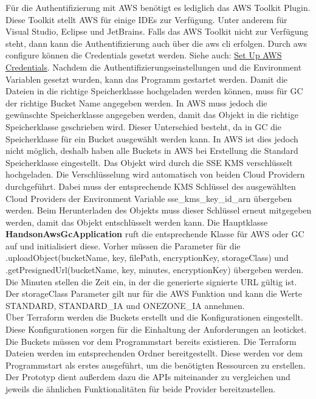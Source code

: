Für die Authentifizierung mit AWS benötigt es lediglich das AWS Toolkit Plugin. Diese Toolkit stellt AWS für einige IDEs zur Verfügung. Unter anderem für Visual Studio, Eclipse und JetBrains. Falls das AWS Toolkit nicht zur Verfügung steht, dann kann die Authentifizierung auch über die aws cli erfolgen. Durch aws configure können die Credentials gesetzt werden. Siehe auch: \href{https://docs.aws.amazon.com/sdk-for-java/latest/developer-guide/setup-basics.html}{Set Up AWS Credentials}. Nachdem die Authentifizierungseinstellungen und die Environment Variablen gesetzt wurden, kann das Programm gestartet werden. Damit die Dateien in die richtige Speicherklasse hochgeladen werden können, muss für GC der richtige Bucket Name angegeben werden. In AWS muss jedoch die gewünschte Speicherklasse angegeben werden, damit das Objekt in die richtige Speicherklasse geschrieben wird. Dieser Unterschied besteht, da in GC die Speicherklasse für ein Bucket ausgewählt werden kann. In AWS ist dies jedoch nicht möglich, deshalb haben alle Buckets in AWS bei Erstellung die Standard Speicherklasse eingestellt. Das Objekt wird durch die SSE KMS verschlüsselt hochgeladen. Die Verschlüsselung wird automatisch von beiden Cloud Providern durchgeführt. Dabei muss der entsprechende KMS Schlüssel des ausgewählten Cloud Providers der Environment Variable sse\_kms\_key\_id\_arn übergeben werden. Beim Herunterladen des Objekts muss dieser Schlüssel erneut mitgegeben werden, damit das Objekt entschlüsselt werden kann. Die Hauptklasse \textbf{HandsonAwsGcApplication} ruft die entsprechende Klasse für AWS oder GC auf und initialisiert diese. Vorher müssen die Parameter für die .uploadObject(bucketName, key, filePath, encryptionKey, storageClass) und .getPresignedUrl(bucketName, key, minutes, encryptionKey) übergeben werden. Die Minuten stellen die Zeit ein, in der die generierte signierte URL gültig ist. Der storageClass Parameter gilt nur für die AWS Funktion und kann die Werte STANDARD, STANDARD\_IA und ONEZONE\_IA annehmen.\\

Über Terraform werden die Buckets erstellt und die Konfigurationen eingestellt. Diese Konfigurationen sorgen für die Einhaltung der Anforderungen an leoticket. Die Buckets müssen vor dem Programmstart bereits existieren. Die Terraform Dateien werden im entsprechenden Ordner bereitgestellt. Diese werden vor dem Programmstart als erstes ausgeführt, um die benötigten Ressourcen zu erstellen.\\

Der Prototyp dient außerdem dazu die APIs miteinander zu vergleichen und jeweils die ähnlichen Funktionalitäten für beide Provider bereitzustellen.

